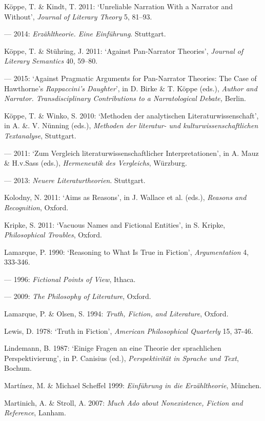 \begin{hangparas}{.5cm}{1}
K\"oppe, T. \& Kindt, T. 2011: `Unreliable Narration With a Narrator and Without', \emph{Journal of Literary Theory} 5, 81--93.

--- 2014: \emph{Erz\"ahltheorie. Eine Einf\"uhrung}. Stuttgart.

K\"oppe, T. \& St\"uhring, J. 2011: `Against Pan-Narrator Theories', \emph{Journal of Literary Semantics} 40, 59--80.

--- 2015: `Against Pragmatic Arguments for Pan-Narrator Theories: The Case of Hawthorne's \emph{Rappaccini's Daughter}', in D. Birke \& T. K\"oppe (eds.), \emph{Author and Narrator. Transdisciplinary Contributions to a Narratological Debate,} Berlin.

K\"oppe, T. \& Winko, S. 2010: `Methoden der analytischen Literaturwissenschaft', in A. \&. V. N\"unning (eds.), \emph{Methoden der literatur- und kulturwissenschaftlichen Textanalyse}, Stuttgart.

--- 2011: `Zum Vergleich literaturwissenschaftlicher Interpretationen', in A. Mauz \& H.v.Sass (eds.), \emph{Hermeneutik des Vergleichs}, W\"urzburg.

--- 2013: \emph{Neuere Literaturtheorien}. Stuttgart.

Kolodny, N. 2011: `Aims as Reasons', in J. Wallace et al. (eds.), \emph{Reasons and Recognition}, Oxford.

Kripke, S. 2011: `Vacuous Names and Fictional Entities', in S. Kripke, \emph{Philosophical Troubles}, Oxford.

Lamarque, P. 1990: `Reasoning to What Is True in Fiction', \emph{Argumentation} 4, 333-346.

--- 1996: \emph{Fictional Points of View}, Ithaca. 

--- 2009: \emph{The Philosophy of Literature}, Oxford. 

Lamarque, P. \& Olsen, S. 1994: \emph{Truth, Fiction, and Literature}, Oxford.

Lewis, D. 1978: `Truth in Fiction', \emph{American Philosophical Quarterly} 15, 37-46.

Lindemann, B. 1987: `Einige Fragen an eine Theorie der sprachlichen Perspektivierung', in P. Canisius (ed.), \emph{Perspektivit\"at in Sprache und Text}, Bochum.

Mart\'inez, M. \& Michael Scheffel 1999: \emph{Einf\"uhrung in die Erz\"ahltheorie}, M\"unchen.

Martinich, A. \& Stroll, A. 2007: \emph{Much Ado about Nonexistence, Fiction and Reference}, Lanham.


\end{hangparas}
